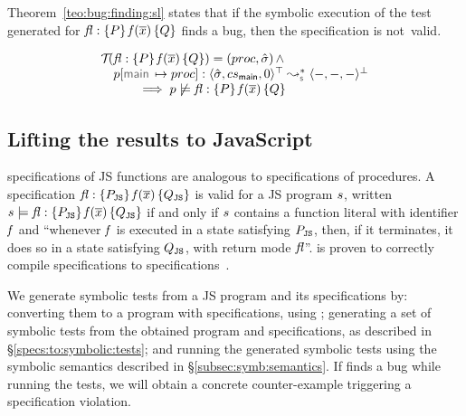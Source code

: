 Theorem~\ref{teo:bug:finding:sl} states that if the symbolic execution of the 
test generated for ${\mathit{fl}} : \{ P \} \, \mathit{f}(\overline{x}) \, \{ Q \}$ finds a bug, then the specification 
is not~valid.

\begin{theorem}\label{teo:bug:finding:sl}
$$
\begin{array}{l}
\testify{}(\specsig{\pass}{\pid(\jvec{x})}{\qass}{\flag})  = (\proc, \sstate) \, \wedge \\
\quad
  \prog[\jsilmain \mapsto \proc] :  \transabssemrule{\sstate, \csmain, 0}{-, -, -}{\top}{\bot}{\symbolic} \\ \quad \qquad 
    \implies  
         \prog \not\satisfies \specsig{\pass}{\pid(\jvec{x})}{\qass}{\flag}
\end{array}
$$
\end{theorem}


\subsection{Lifting the results to JavaScript}\label{subsec:liftmejs2}

\javert specifications of JS functions are analogous to \jsil specifications of \jsil procedures.
A \javert specification ${\mathit{fl}} : \{ P_{\mathtt{JS}} \} \, \mathit{f}(\overline{x}) \, \{ Q_{\mathtt{JS}} \}$
is valid for a JS program $s$, written $s \models {\ensuremath{\mathit{fl}}} : \{ P_{\mathtt{JS}} \} \, \mathit{f}(\overline{x}) \, \{ Q_{\mathtt{JS}} \}$ if and only if $s$ contains a function literal with identifier $\mathit{f}$ and ``whenever $\mathit{f}$ is executed in a state satisfying $P_{\mathtt{JS}}$, then, 
if it terminates, it does so in a state satisfying $Q_{\mathtt{JS}}$, with return mode $\mathit{fl}$''. 
\JSComp is proven to correctly compile \javert specifications to \jsil specifications~\cite{javert}.

We generate symbolic tests from a JS program and its \javert specifications by: converting them to a \jsil program with \jsil specifications, using \jstojsil; generating a set of symbolic tests from the obtained \jsil program and \jsil specifications, as described in \S\ref{specs:to:symbolic:tests}; and running the generated \jsil symbolic tests using the \jsil symbolic semantics described in \S\ref{subsec:symb:semantics}. 
If \cosette finds a bug while running the tests, we will obtain a concrete counter-example triggering a specification violation.

